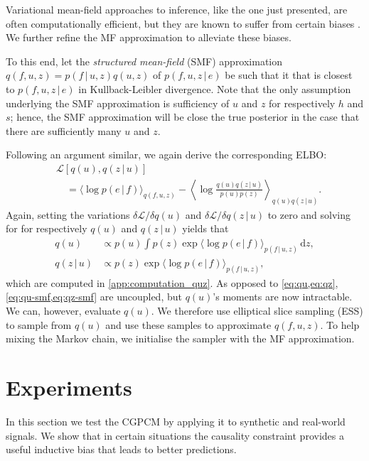 \documentclass{article}
\newcommand{\id}[1]{\, \mathrm{d} #1}     %
\newcommand{\cond}{\, | \,}               %
\renewcommand{\ll}{\left}
\newcommand{\rr}{\right}
\newcommand{\la}{\langle}
\newcommand{\ra}{\rangle}
\begin{document}
Variational mean-field approaches to inference, like the one just presented, are often computationally efficient, but they are known to suffer from certain biases \cite{MacKay:2002:Information_Theory_Learning,Turner:2011:Two_Problems_With_Variational_Expectation,Murphy:2012:Probabilistic_Perspective}. We further refine the MF approximation to alleviate these biases.

To this end, let the \textit{structured mean-field} (SMF) approximation $q(f,u,z)=p(f\cond u, z)q(u,z)$ of $p(f,u,z\cond e)$ be such that it that is closest to $p(f,u,z\cond e)$ in Kullback-Leibler divergence. Note that the only assumption underlying the SMF approximation is sufficiency of $u$ and $z$ for respectively $h$ and $s$; hence, the SMF approximation will be close the true posterior in the case that there are sufficiently many $u$ and $z$.

Following an argument similar, we again derive the corresponding ELBO:
\begin{align*}
    &\mathcal{L}[q(u),q(z\cond u)] \\
    &\quad= \la \log p(e\cond f) \ra_{q(f,u,z)}- \ll\la\log\frac{q(u)q(z\cond u)}{p(u)p(z)}\rr\ra_{q(u)q(z\cond u)}.
\end{align*}
Again, setting the variations $\delta \mathcal{L} / \delta q(u)$ and $\delta \mathcal{L} / \delta q(z\cond u)$ to zero and solving for for respectively $q(u)$ and $q(z\cond u)$ yields that
\begin{align}
    q(u) &\propto p(u) \int p(z) \exp\la\log p(e\cond f)\ra_{p(f\cond u, z)}\id{z}, \label{eq:qu-smf} \\
    q(z\cond u) &\propto p(z)\exp\la \log p(e\cond f)\ra_{p(f\cond u, z)}, \label{eq:qz-smf}
\end{align}
which are computed in \cref{app:computation_quz}.
As opposed to \cref{eq:qu,eq:qz}, \cref{eq:qu-smf,eq:qz-smf} are uncoupled, but $q(u)$'s moments are now intractable. We can, however, evaluate $q(u)$. We therefore use elliptical slice sampling (ESS) \cite{Murray:2010:Elliptical_Slice_Sampling} to sample from $q(u)$ and use these samples to approximate $q(f, u, z)$. To help mixing the Markov chain, we initialise the sampler with the MF approximation.

\section{Experiments}
In this section we test the CGPCM by applying it to synthetic and real-world signals. We show that in certain situations the causality constraint provides a useful inductive bias that leads to better predictions.
\end{document}
